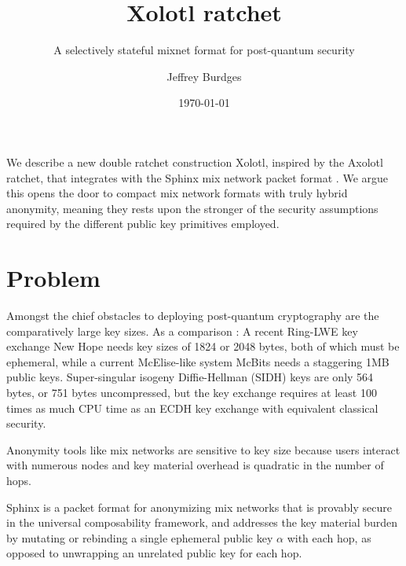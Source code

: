 \documentclass[twoside,letterpaper]{sig-alternate}
\title{Xolotl ratchet}
\subtitle{A selectively stateful mixnet format for post-quantum security}
\author{Jeffrey Burdges}
\date{\today}
\begin{document}
\maketitle



We describe a new double ratchet construction Xolotl,
 inspired by the Axolotl ratchet, %
that integrates with the Sphinx mix network packet format \cite{Sphinx}.
We argue this opens the door to compact mix network formats with
truly hybrid anonymity, meaning they rests upon the stronger of the
security assumptions required by the different public key primitives employed.


\section{Problem} %

Amongst the chief obstacles to deploying post-quantum cryptography are
the comparatively large key sizes.  As a comparison : 
%
A recent Ring-LWE key exchange New Hope \cite[\S7, p.10]{NewHope} needs
 key sizes of 1824 or 2048 bytes, both of which must be ephemeral,
while a current McElise-like system McBits %
 needs a staggering 1MB public keys.
%
Super-singular isogeny Diffie-Hellman (SIDH) \cite[p. 21]{SIDH-2016} keys
are only 564 bytes, or 751 bytes uncompressed, but
 the key exchange requires at least 100 times as much CPU time as
 an ECDH key exchange with equivalent classical security.

Anonymity tools like mix networks are sensitive to key size because 
users interact with numerous nodes and key material overhead is 
quadratic in the number of hops. %

\smallskip

Sphinx \cite{Sphinx} is a packet format for anonymizing mix networks
that is provably secure in the universal composability framework, and
 addresses the key material burden by mutating or rebinding a
 single ephemeral public key $\alpha$ with each hop,
 as opposed to unwrapping an unrelated public key for each hop.
\end{document}
